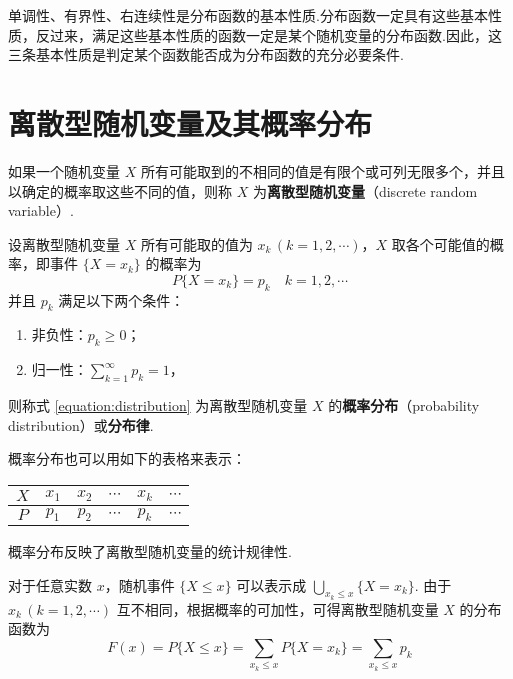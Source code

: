 单调性、有界性、右连续性是分布函数的基本性质.分布函数一定具有这些基本性质，反过来，满足这些基本性质的函数一定是某个随机变量的分布函数.因此，这三条基本性质是判定某个函数能否成为分布函数的充分必要条件.

\section{离散型随机变量及其概率分布}

\begin{definition}
    如果一个随机变量 $X$ 所有可能取到的不相同的值是有限个或可列无限多个，并且以确定的概率取这些不同的值，则称 $X$ 为\textbf{离散型随机变量}（discrete random variable）.
\end{definition}

\begin{definition}
    设离散型随机变量 $X$ 所有可能取的值为 $x_k\, (k=1,2,\cdots)$，$X$ 取各个可能值的概率，即事件 $\{X=x_k\}$ 的概率为
    \begin{equation} \label{equation:distribution}
        P\{X=x_k\} = p_k \quad k=1,2,\cdots
    \end{equation}
    并且 $p_k$ 满足以下两个条件：
    \begin{enumerate}
        \item 非负性：$p_k \geqslant 0$；\vspace{0.5em}
        \item 归一性：$\displaystyle\sum_{k=1}^\infty p_k=1$，
    \end{enumerate} \vspace{0.5em}
    则称式 \eqref{equation:distribution} 为离散型随机变量 $X$ 的\textbf{概率分布}（probability distribution）或\textbf{分布律}.
\end{definition}

概率分布也可以用如下的表格来表示：
\begin{table*}[htbp]
    \centering

    \begin{tabular}{c | c c c c c}
        \hline
        $X$ & $x_1$ & $x_2$ & $\cdots$ & $x_k$ & $\cdots$ \\
        \hline
        $P$ & $p_1$ & $p_2$ & $\cdots$ & $p_k$ & $\cdots$ \\
        \hline
    \end{tabular}
\end{table*}

概率分布反映了离散型随机变量的统计规律性.

对于任意实数 $x$，随机事件 $\{X \leqslant x\}$ 可以表示成 $\displaystyle\bigcup_{x_k \leqslant x} \{X=x_k\}$. 由于 $x_k\, (k=1,2,\cdots)$ 互不相同，根据概率的可加性，可得离散型随机变量 $X$ 的分布函数为
$$
F(x) = P\{X \leqslant x\} = \sum_{x_k \leqslant x} P\{X=x_k\} = \sum_{x_k \leqslant x} p_k
$$


